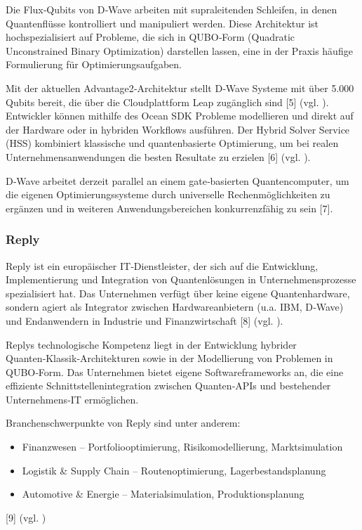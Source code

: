 Die Flux‑Qubits von D‑Wave arbeiten mit supraleitenden Schleifen, in denen Quantenflüsse kontrolliert und manipuliert werden.
Diese Architektur ist hochspezialisiert auf Probleme, die sich in QUBO‑Form (Quadratic Unconstrained Binary Optimization) darstellen lassen, eine in der Praxis häufige Formulierung für Optimierungsaufgaben.

Mit der aktuellen Advantage2‑Architektur stellt D‑Wave Systeme mit über 5.000 Qubits bereit, die über die Cloudplattform Leap zugänglich sind [5] (vgl. \cite{brandhofer_benchmarking_2022}).
Entwickler können mithilfe des Ocean SDK Probleme modellieren und direkt auf der Hardware oder in hybriden Workflows ausführen.
Der Hybrid Solver Service (HSS) kombiniert klassische und quantenbasierte Optimierung, um bei realen Unternehmensanwendungen die besten Resultate zu erzielen [6] (vgl. \cite{brandhofer_benchmarking_2022}).

D‑Wave arbeitet derzeit parallel an einem gate‑basierten Quantencomputer, um die eigenen Optimierungssysteme durch universelle Rechenmöglichkeiten zu ergänzen und in weiteren Anwendungsbereichen konkurrenzfähig zu sein [7].

\subsubsection*{Reply}
Reply ist ein europäischer IT‑Dienstleister, der sich auf die Entwicklung, Implementierung und Integration von Quantenlösungen in Unternehmensprozesse spezialisiert hat.
Das Unternehmen verfügt über keine eigene Quantenhardware, sondern agiert als Integrator zwischen Hardwareanbietern (u.a. IBM, D‑Wave) und Endanwendern in Industrie und Finanzwirtschaft [8] (vgl. \cite{brandhofer_benchmarking_2022}).

Replys technologische Kompetenz liegt in der Entwicklung hybrider Quanten‑Klassik‑Architekturen sowie in der Modellierung von Problemen in QUBO‑Form.
Das Unternehmen bietet eigene Softwareframeworks an, die eine effiziente Schnittstellenintegration zwischen Quanten‑APIs und bestehender Unternehmens‑IT ermöglichen.

Branchenschwerpunkte von Reply sind unter anderem:

\begin{itemize}
\item Finanzwesen – Portfoliooptimierung, Risikomodellierung, Marktsimulation
\item Logistik \& Supply Chain – Routenoptimierung, Lagerbestandsplanung
\item Automotive \& Energie – Materialsimulation, Produktionsplanung
\end{itemize}
[9] (vgl. \cite{brandhofer_benchmarking_2022})

